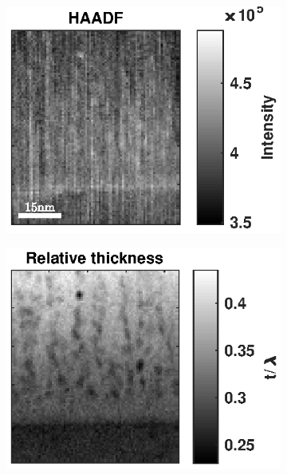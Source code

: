 \documentclass[%
 aip,
rsi,%
 amsmath,amssymb,
 reprint,%
]{revtex4-1}
\begin{document}
\begin{figure}
	\centering
    \begin{subfigure}{0.3\textwidth}
    	\includegraphics[width=\textwidth]{HAADF_SI1}
        \subcaption{}
		\label{fig:HAADF}
    \end{subfigure}
    \begin{subfigure}{0.3\textwidth}
		\includegraphics[width=\textwidth]{relative_thickness_map_SI1}
		\subcaption{}
		\label{fig:tl}
	\end{subfigure}
    

\end{figure}
\end{document}
